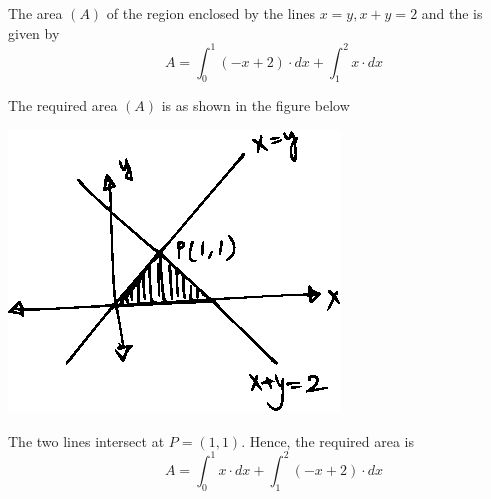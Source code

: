\documentclass[14pt,fleqn]{extarticle}
\begin{document}
 
\begin{snippet}
    
    \incorrect
    
    The area $(A)$ of the region enclosed by the lines $x = y, x + y =2$ and the \xaxis is given by 
    \[ \qquad A = \int_0^1 \left(-x+2 \right)\cdot dx + \int_1^2 x\cdot dx \]
    
    \reason
    
    The required area $(A)$ is as shown in the figure below 
    
    \begin{center}
\includegraphics[scale=1.4]{figure.eps}
\end{center}

    The two lines intersect at $P = (1,1)$. Hence, the required area is 
    \[ \qquad A = \int_0^1 x\cdot dx + \int_1^2 \left(-x+2 \right)\cdot dx \]
    
\end{snippet} 
\end{document}
